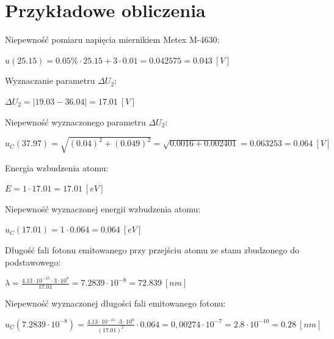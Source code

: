 \documentclass[12pt, a4paper, oneside]{article}
\begin{document}
\section{Przykładowe obliczenia}
Niepewność pomiaru napięcia miernikiem Metex M-4630:
\begin{center}
$u(25.15)=0.05\%\cdot25.15 + 3\cdot 0.01=0.042575=0.043~[V]$
\end{center}
Wyznaczanie parametru $\Delta U_2$:
\begin{center}
$\Delta U_2=|19.03 - 36.04| = 17.01~[V]$
\end{center}
Niepewność wyznaczonego parametru $\Delta U_2$:
\begin{center}
$u_C(37.97)=\sqrt{(0.04)^2+(0.049)^2}=\sqrt{0.0016 + 0.002401}= 0.063253=0.064~[V]$
\end{center}
Energia wzbudzenia atomu:
\begin{center}
$E=1\cdot 17.01=17.01~[eV]$
\end{center}
Niepewność wyznaczonej energii wzbudzenia atomu:
\begin{center}
$u_C(17.01)=1\cdot 0.064=0.064~[eV]$
\end{center}
Długość fali fotonu emitowanego przy przejściu atomu ze stanu zbudzonego do podstawowego:
\begin{center}
$\lambda = \frac{4.13\cdot 10^{-15} \cdot 3 \cdot 10^8}{17.01}=7.2839\cdot10^{-8}=72.839~[nm]$
\end{center}
Niepewność wyznaczonej długości fali emitowanego fotonu:
\begin{center}
$u_C(7.2839\cdot10^{-8})=\frac{4.13\cdot10^{-15}\cdot 3\cdot10^8}{(17.01)^2}\cdot 0.064=0,00274\cdot10^{-7}=2.8\cdot10^{-10}=0.28~[nm]$
\end{center}
\clearpage
\end{document}

